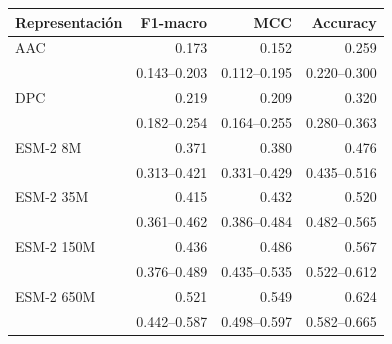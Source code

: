\begingroup\small\setlength{\tabcolsep}{3pt}
\begin{tabular}{lrrr}
\toprule
Representación & F1-macro & MCC & Accuracy \\
\midrule
AAC & 0.173 & 0.152 & 0.259 \\
 & {\scriptsize 0.143--0.203} & {\scriptsize 0.112--0.195} & {\scriptsize 0.220--0.300} \\
DPC & 0.219 & 0.209 & 0.320 \\
 & {\scriptsize 0.182--0.254} & {\scriptsize 0.164--0.255} & {\scriptsize 0.280--0.363} \\
ESM-2 8M & 0.371 & 0.380 & 0.476 \\
 & {\scriptsize 0.313--0.421} & {\scriptsize 0.331--0.429} & {\scriptsize 0.435--0.516} \\
ESM-2 35M & 0.415 & 0.432 & 0.520 \\
 & {\scriptsize 0.361--0.462} & {\scriptsize 0.386--0.484} & {\scriptsize 0.482--0.565} \\
ESM-2 150M & 0.436 & 0.486 & 0.567 \\
 & {\scriptsize 0.376--0.489} & {\scriptsize 0.435--0.535} & {\scriptsize 0.522--0.612} \\
ESM-2 650M & 0.521 & 0.549 & 0.624 \\
 & {\scriptsize 0.442--0.587} & {\scriptsize 0.498--0.597} & {\scriptsize 0.582--0.665} \\
\bottomrule
\end{tabular}
\endgroup
